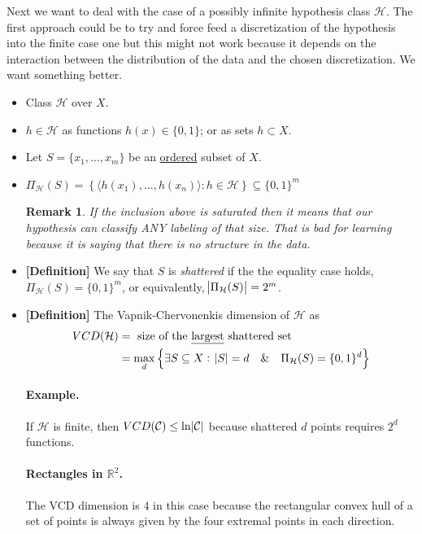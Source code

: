 \documentclass[12pt, letterpaper]{article}
\numberwithin{equation}{section} %
\newcommand{\R}{\mathbb{R}}
\newcommand{\ul}{\underline}
\newcommand{\mc}{\mathcal}
\newtheorem{remark}[theorem]{Remark}
\theoremstyle{definition}
\theoremstyle{remark}
\begin{document}
Next we want to deal with the case of a possibly infinite hypothesis class $\mc H$. The first approach could be to try and force feed a discretization of the hypothesis into the finite case one but this might not work because it depends on the interaction between the distribution of the data and the chosen discretization. We want something better.

\begin{itemize}
    \item Class $\mc H$ over $X$.
    \item $h\in \mc H$ as functions $h(x)\in \lbrace0,1\rbrace$; or as sets $h\subset X$.
    \item Let $S=\lbrace x_1,\ldots,x_m\rbrace$ be an \ul{ordered} subset of $X$.
    \item $\Pi_{\mc H}(S) = \left\{\langle h(x_1),\ldots,h(x_n)\rangle:h\in\mc H\right\} \subseteq \lbrace0,1\rbrace^m$
    \begin{remark}
        If the inclusion above is saturated then it means that our hypothesis can classify ANY labeling of that size. That is bad for learning because it is saying that there is no structure in the data.
    \end{remark}
    \item {\bf [Definition]} We say that $S$ is \emph{shattered} if the the equality case holds, $\Pi_{\mc H}(S) = \lbrace 0, 1\rbrace^m$, or equivalently, $\abs{\Pi_{\mc H}(S)} = 2^m$.
    \item {\bf [Definition]} The Vapnik-Chervonenkis dimension of $\mc H$ as
            \begin{align}
                VCD(\mc H) &= \textrm{ size of the \ul{largest} shattered set}\\
                             &= \max\limits_d\left\{\exists S\subseteq X:\;\abs{S}=d\quad\&\quad\Pi_{\mc H}(S) = \lbrace 0,1\rbrace^d\right\}
            \end{align}
    \paragraph{Example.} If $\mc H$ is finite, then $VCD(\mc C)\leq \ln\abs{\mc C}$ because shattered $d$ points requires $2^d$ functions.
    
    \paragraph{Rectangles in $\R^2$.} The VCD dimension is $4$ in this case because the rectangular convex hull of a set of points is always given by the four extremal points in each direction.
\end{itemize}
\end{document}
